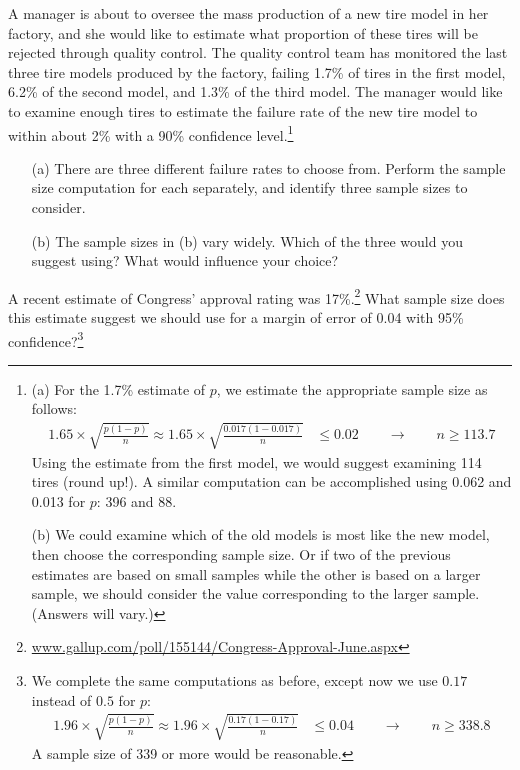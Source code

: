 \begin{exercise}
A manager is about to oversee the mass production of a new tire model in her factory, and she would like to estimate what proportion of these tires will be rejected through quality control. The quality control team has monitored the last three tire models produced by the factory, failing 1.7\% of tires in the first model, 6.2\% of the second model, and 1.3\% of the third model. The manager would like to examine enough tires to estimate the failure rate of the new tire model to within about 2\% with a 90\% confidence level.\footnote{(a) For the 1.7\% estimate of $p$, we estimate the appropriate sample size as follows:
\begin{align*}
1.65\times \sqrt{\frac{p(1-p)}{n}} \approx
1.65\times \sqrt{\frac{0.017(1-0.017)}{n}} &\leq 0.02 \qquad\to\qquad n \geq 113.7
\end{align*}
Using the estimate from the first model, we would suggest examining 114 tires (round up!). A similar computation can be accomplished using 0.062 and 0.013 for $p$: 396 and 88. \par
(b) We could examine which of the old models is most like the new model, then choose the corresponding sample size. Or if two of the previous estimates are based on small samples while the other is based on a larger sample, we should consider the value corresponding to the larger sample. (Answers will vary.)}
\begin{itemize}
\setlength{\itemsep}{0mm}
\item[(a)] There are three different failure rates to choose from. Perform the sample size computation for each separately, and identify three sample sizes to consider.
\item[(b)] The sample sizes in (b) vary widely. Which of the three would you suggest using? What would influence your choice?
\end{itemize}
\end{exercise}


\begin{exercise}
A recent estimate of Congress' approval rating was 17\%.\footnote{\href{http://www.gallup.com/poll/155144/Congress-Approval-June.aspx}{www.gallup.com/poll/155144/Congress-Approval-June.aspx}} What sample size does this estimate suggest we should use for a margin of error of 0.04 with 95\% confidence?\footnote{We complete the same computations as before, except now we use $0.17$ instead of $0.5$ for $p$:
\begin{align*}
1.96\times \sqrt{\frac{p(1-p)}{n}} \approx
1.96\times \sqrt{\frac{0.17(1-0.17)}{n}} &\leq 0.04 \qquad\to\qquad n \geq 338.8
\end{align*}
A sample size of 339 or more would be reasonable.}


\end{exercise}


